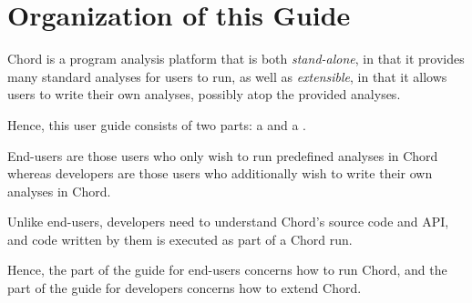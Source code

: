 \chapter{Organization of this Guide}
\label{chap:organization}

Chord is a program analysis platform that is both {\it stand-alone}, in that it
provides many standard analyses for users to run, as well as {\it extensible},
in that it allows users to write their own analyses, possibly atop the provided
analyses.

Hence, this user guide consists of two parts: a
 and a
.

End-users are those users who only wish to run predefined analyses in Chord
whereas developers are those users who additionally wish to write their own
analyses in Chord.

Unlike end-users, developers need to understand Chord's source code and API, and
code written by them is executed as part of a Chord run.

Hence, the part of the guide for end-users concerns how to run Chord, and the
part of the guide for developers concerns how to extend Chord.

